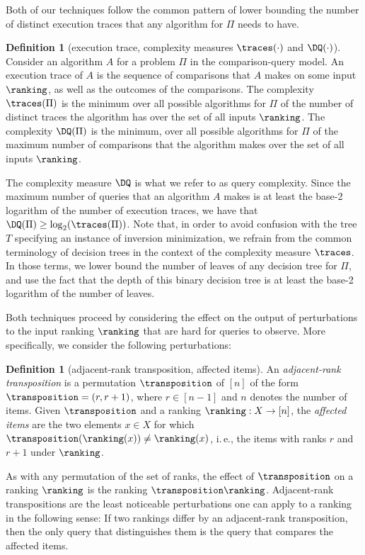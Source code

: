 \documentclass[11pt]{article}
\numberwithin{equation}{section}
\theoremstyle{definition}
\newtheorem{definition}[theorem]{Definition}
\theoremstyle{plain}
\newcommand{\ie}{i.\,e.}
\begin{document}
Both of our techniques follow the common pattern of lower bounding the number of distinct execution traces that any algorithm for $\Pi$ needs to have.
\begin{definition}[execution trace, complexity measures $\traces(\cdot)$ and $\DQ(\cdot)$]
\label{def:execution-and-deterministic}
Consider an algorithm $A$ for a problem $\Pi$ in the comparison-query model. An execution trace of $A$ is the sequence of comparisons that $A$ makes on some input $\ranking$, as well as the outcomes of the comparisons. The complexity $\traces(\Pi)$ is the minimum over all possible algorithms for $\Pi$ of the number of distinct traces the algorithm has over the set of all inputs $\ranking$. The complexity $\DQ(\Pi)$ is the minimum, over all possible algorithms for $\Pi$ of the maximum number of comparisons that the algorithm makes over the set of all inputs $\ranking$.
\end{definition}
The complexity measure $\DQ$ is what we refer to as query complexity. Since the maximum number of queries that an algorithm $A$ makes is at least the base-2 logarithm of the number of execution traces, we have that $\DQ(\Pi) \ge \log_2(\traces(\Pi))$. 
Note that, in order to avoid confusion with the tree $T$ specifying an instance of inversion minimization, we refrain from the common terminology of decision trees in the context of the complexity measure $\traces$. In those terms, we lower bound the number of leaves of any decision tree for $\Pi$, and use the fact that the depth of this binary decision tree is at least the base-2 logarithm of the number of leaves.

Both techniques proceed by considering the effect on the output of perturbations to the input ranking $\ranking$ that are hard for queries to observe. More specifically, we consider the following perturbations:
\begin{definition}[adjacent-rank transposition, affected items]
An \emph{adjacent-rank transposition} is a permutation $\transposition$ of $[n]$ of the form $\transposition = (r,r+1)$, where $r \in [n-1]$ and $n$ denotes the number of items. Given $\transposition$ and a ranking $\ranking: X \to [n]$, the \emph{affected items} are the two elements $x \in X$ for which $\transposition(\ranking(x)) \ne \ranking(x)$, \ie, the items with ranks $r$ and $r+1$ under $\ranking$. 
\end{definition}
As with any permutation of the set of ranks, the effect of $\transposition$ on a ranking $\ranking$ is the ranking $\transposition \ranking$. 
Adjacent-rank transpositions are the least noticeable perturbations one can apply to a ranking in the following sense: If two rankings differ by an adjacent-rank transposition, then the only query that distinguishes them is the query that compares the affected items. 
\end{document}
